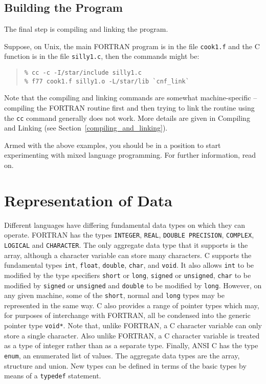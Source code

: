 \documentclass[twoside,11pt]{article}
\newcommand{\htmlref}[2]{#1}
\newcommand{\latex}[1]{#1}
\newcommand{\xlabel}[1]{}
\renewcommand{\_}{\texttt{\symbol{95}}}
\newcounter{examples}
\begin{document}
\subsection{\xlabel{building_the_program}Building the Program}
The final step is compiling and linking the program.

Suppose, on Unix, the main FORTRAN program is in the file \texttt{cook1.f} and 
the C function is in the file \texttt{silly1.c}, then the commands might be:

\begin{quote} \begin{verbatim}
% cc -c -I/star/include silly1.c
% f77 cook1.f silly1.o -L/star/lib `cnf_link`
\end{verbatim} \end{quote}

Note that the compiling and linking commands are somewhat machine-specific
-- compiling the FORTRAN routine first and then trying to link the routine
using the \texttt{cc} command generally does not work.
More details are given in
\htmlref{Compiling and Linking}
{compiling_and_linking}\latex{ (see Section~\ref{compiling_and_linking})}.

Armed with the above examples, you should be in a position to start
experimenting with mixed language programming. For further information, read
on.

\section{\xlabel{representation_of_data}Representation of Data}

Different languages have differing fundamental data types on which they can
operate. FORTRAN has the types \texttt{INTEGER}, \texttt{REAL}, 
\texttt{DOUBLE  PRECISION}, \texttt{COMPLEX}, \texttt{LOGICAL} and 
\texttt{CHARACTER}\@. The only aggregate data type that it supports is the
array, although a character variable can store many characters. C supports the
fundamental types \texttt{int}, \texttt{float}, \texttt{double}, \texttt{char},
and \texttt{void}. It also allows \texttt{int} to be modified by the type 
specifiers \texttt{short} or \texttt{long}, \texttt{signed} or 
\texttt{unsigned}, \texttt{char} to be modified
by \texttt{signed} or \texttt{unsigned} and \texttt{double} to be modified by
\texttt{long}. However, on any given machine, some of the \texttt{short}, 
normal and \texttt{long} types may be represented in the same way.
C also provides a range of pointer types which may, for purposes of
interchange with FORTRAN, all be condensed into the generic pointer
type \texttt{void*}.
Note that, unlike FORTRAN, a C character variable can only store a single 
character. 
Also unlike FORTRAN, a C
character variable is treated as a type of integer rather than as a separate
type. Finally, ANSI C has the type \texttt{enum}, an enumerated list of values.
The aggregate data types are the array, structure and union. New types can be
defined in terms of the basic types by means of a \texttt{typedef} statement.
\end{document}
